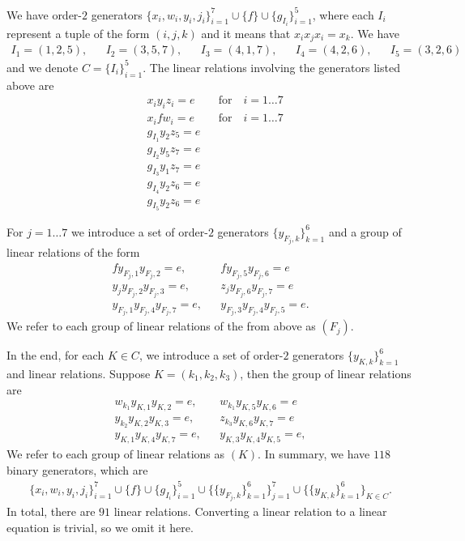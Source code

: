 We have order-$2$ generators $\{x_i, w_i, y_i, j_i\}_{i=1}^{7} \cup \{f\} \cup \{g_{I_i}\}_{i=1}^5$,
where each $I_i$ represent a tuple of the form $(i,j,k)$ and it means that $x_ix_jx_i = x_k$.
We have 
\begin{align}
	I_1 = (1,2,5), 
	&&I_2 = (3,5,7), 
	&&I_3 = (4,1,7), 
	&&I_4 = (4,2,6), 
	&&I_5 = (3,2,6)
\end{align} 
and we denote $C = \{I_i\}_{i=1}^5$.
The linear relations involving the generators listed above are
\begin{align}
	\label{eq:xyz} &x_i y_i z_i = e  &&\text{for} \quad i =1\dots 7 \\
	\label{eq:xfw} &x_i f w_i = e   &&\text{for} \quad i =1\dots 7 \\
	&g_{I_1} y_2z_5 =e \\
	&g_{I_2} y_5z_7 =e \\
	&g_{I_3} y_1z_7 =e \\
	&g_{I_4} y_2z_6 =e \\
	&g_{I_5} y_2z_6 =e 
\end{align}

For $j =1 \dots 7$ we introduce a set of order-$2$ generators 
$\{ y_{F_j,k}\}_{k=1}^6$ and
a group of linear relations of the form
\begin{align}
	f y_{F_j,1} y _{F_j,2} = e, && f y_{F_j,5} y_{F_j,6} = e \\
	y_j y_{F_j,2} y _{F_j,3} = e, && z_j y_{F_j,6} y_{F_j,7} = e \\
	y_{F_j,1} y_{F_j,4} y _{F_j,7} = e, && y_{F_j,3} y_{F_j,4} y_{F_j,5} = e.
\end{align}
We refer to each group of linear relations of the from above as $(F_j)$.

In the end, for each $K \in C$, 
we introduce a set of order-$2$ generators $\{y_{K,k}\}_{k=1}^6$ and
linear relations.
Suppose $K = (k_1,k_2,k_3)$, then the group of linear relations are
\begin{align}
	w_{k_1} y_{K,1} y _{K,2} = e, && w_{k_1} y_{K,5} y_{K,6} = e \\
	y_{k_2} y_{K,2} y _{K,3} = e, && z_{k_3} y_{K,6} y_{K,7} = e \\
	y_{K,1} y_{K,4} y _{K,7} = e, && y_{K,3} y_{K,4} y_{K,5} = e,
\end{align}
We refer to each group of linear relations as $(K)$.
In summary, we have $118$ binary generators, which are
\begin{align}
\{x_i, w_i, y_i, j_i\}_{i=1}^{7} \cup \{f\} \cup \{g_{I_i}\}_{i=1}^5\cup\{\{y_{F_j,k}\}_{k=1}^6\}_{j=1}^7
\cup \{\{y_{K,k}\}_{k=1}^6\}_{K \in C}.
\end{align}
In total, there are $91$ linear relations.
Converting a linear relation to a linear equation is trivial, so we omit it here.

